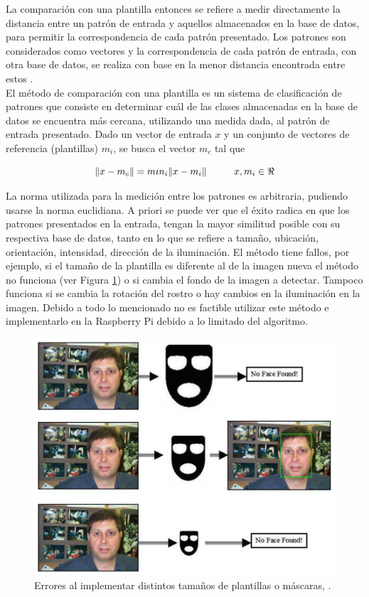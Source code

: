 \documentclass[letterpaper,12pt]{article}
\begin{document}
La comparación con una plantilla entonces se refiere a medir directamente la distancia entre un patrón de entrada y aquellos almacenados en la base de datos, para permitir la correspondencia de cada patrón presentado. Los patrones son considerados como vectores y la correspondencia de cada patrón de entrada, con otra base de datos, se realiza con base en la menor distancia encontrada entre estos \cite{bunschoten}.\\
El método de comparación con una plantilla es un sistema de clasificación de patrones que consiste en determinar cuál de las clases almacenadas en la base de datos se encuentra más cercana, utilizando una medida dada, al patrón de entrada presentado. Dado un vector de entrada $x$ y un conjunto de vectores de referencia (plantillas) $m_{i}$, se busca el vector $m_{c}$ tal que

\begin{equation}
    \left\lVert x - m_{c} \right\rVert = 
            min_{i}{\left\lVert x-m_{i}\right\rVert}  \hspace{1cm} x,m_{i} \in \Re
\end{equation}

La norma utilizada para la medición entre los patrones es arbitraria, pudiendo usarse la norma euclidiana. A priori se puede ver que el éxito radica en que los patrones presentados en la entrada, tengan la mayor similitud posible con su respectiva base de datos, tanto en lo que se refiere a tamaño, ubicación, orientación, intensidad, dirección de la iluminación. El método tiene fallos, por ejemplo, si el tamaño de la plantilla es diferente al de la imagen nueva el método no funciona (ver Figura \ref{fig:Mascaras}) o si cambia el fondo de la imagen a detectar. Tampoco funciona si se cambia la rotación del rostro o hay cambios en la iluminación en la imagen. Debido a todo lo mencionado no es factible utilizar este método e implementarlo en la Raspberry Pi debido a lo limitado del algoritmo.

\begin{figure}[H]
\centering
\includegraphics[scale=0.5]{Figs/DifferentSizeModes.png}
\caption{Errores al implementar distintos tamaños de plantillas o máscaras, \cite{AmirFa}.}
\label{fig:Mascaras}
\end{figure}
\end{document}
